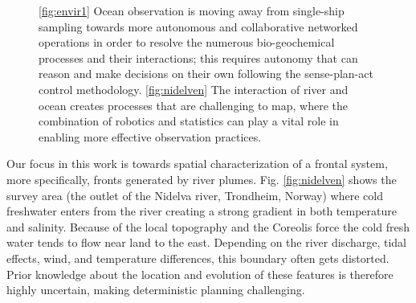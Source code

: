 \documentclass[aoas]{imsart}
\begin{document}
\begin{figure}[!h] 
  \centering 
  \hfill
  \caption{\ref{fig:envir1} Ocean observation is moving away from single-ship sampling towards more autonomous and collaborative networked operations in order to resolve the numerous bio-geochemical processes and their interactions; this requires autonomy that can reason and make decisions on their own following the sense-plan-act control methodology. \ref{fig:nidelven} The interaction of river and ocean creates processes that are challenging to map, where the combination of robotics and statistics can play a vital role in enabling more effective observation practices.}
\label{fig:envir}
\end{figure}

Our focus in this work is towards spatial characterization of a
frontal system, more specifically, fronts generated by river
plumes. Fig. \ref{fig:nidelven} shows the survey area (the outlet of
the Nidelva river, Trondheim, Norway) where cold freshwater enters
from the river creating a strong gradient in both temperature and
salinity. Because of the local topography and the Coreolis force
\citep{coriolis1835memoire} the cold fresh water tends to flow near
land to the east. Depending on the river discharge, tidal effects,
wind, and temperature differences, this boundary often gets
distorted. Prior knowledge about the location and evolution of these
features is therefore highly uncertain, making deterministic planning
challenging.
\end{document}
